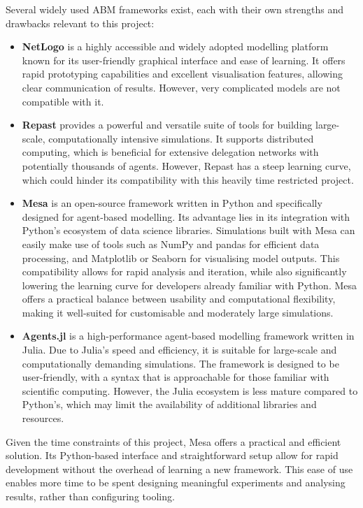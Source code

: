 Several widely used ABM frameworks exist, each with their own strengths and drawbacks relevant to this project:
\begin{itemize}
  \item \textbf{NetLogo} \citep{netlogo} is a highly accessible and widely adopted modelling platform known for its user-friendly graphical interface and ease of learning. It offers rapid prototyping capabilities and excellent visualisation features, allowing clear communication of results. However, very complicated models are not compatible with it.
  \item \textbf{Repast} \citep{repast} provides a powerful and versatile suite of tools for building large-scale, computationally intensive simulations. It supports distributed computing, which is beneficial for extensive delegation networks with potentially thousands of agents. However, Repast has a steep learning curve, which could hinder its compatibility with this heavily time restricted project.
  \item \textbf{Mesa} \citep{kazil_utilizing_2020} is an open-source framework written in Python and specifically designed for agent-based modelling. Its advantage lies in its integration with Python's ecosystem of data science libraries. Simulations built with Mesa can easily make use of tools such as NumPy and pandas for efficient data processing, and Matplotlib or Seaborn for visualising model outputs. This compatibility allows for rapid analysis and iteration, while also significantly lowering the learning curve for developers already familiar with Python. Mesa offers a practical balance between usability and computational flexibility, making it well-suited for customisable and moderately large simulations.
  \item \textbf{Agents.jl} \citep{agentsjl} is a high-performance agent-based modelling framework written in Julia. Due to Julia's speed and efficiency, it is suitable for large-scale and computationally demanding simulations. The framework is designed to be user-friendly, with a syntax that is approachable for those familiar with scientific computing. However, the Julia ecosystem is less mature compared to Python's, which may limit the availability of additional libraries and resources. 
\end{itemize}
Given the time constraints of this project, Mesa offers a practical and efficient solution. Its Python-based interface and straightforward setup allow for rapid development without the overhead of learning a new framework. This ease of use enables more time to be spent designing meaningful experiments and analysing results, rather than configuring tooling.
